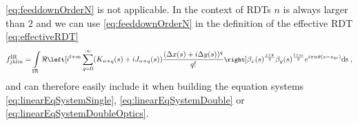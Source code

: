\cref{eq:feeddownOrderN} is not applicable.
In the context of RDTs $n$ is always larger than 2 and we can use \cref{eq:feeddownOrderN} 
in the definition of the effective RDT \cref{eq:effectiveRDT}
%
\begin{equation}
    \label{eq:effectiveRDTfeeddown}
    \small
    f^\text{IR}_{jklm} =  \int\limits_\text{IR} 
    \ReOf{    
     i^{l+m}
     \sum_{q = 0}^{\infty} 
     (K_{n+q}(s) + iJ_{n+q}(s)) \frac{(\Delta x(s) + i \Delta y(s))^q}{q!} 
    }
        \beta_x(s)^{\frac{j+k}{2}}
        \beta_y(s)^{\frac{l+m}{2}} 
     e^{i \pi n \theta(s - s_\text{IP})}
    \rm{d}s \; ,
\end{equation}
%
and can therefore easily include it when building the equation systems 
\cref{eq:linearEqSystemSingle}, \cref{eq:linearEqSystemDouble} or \cref{eq:linearEqSystemDoubleOptics}.


